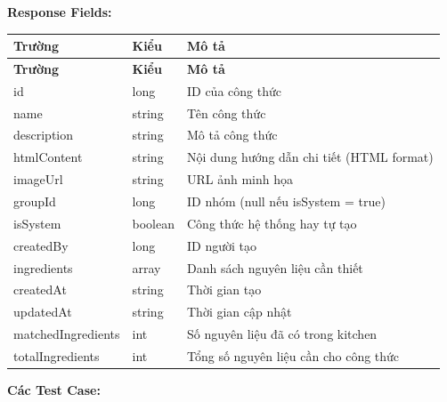 \textbf{Response Fields:}

\begin{longtable}{|p{}|p{}|p{}|}
\hline
\textbf{Trường} & \textbf{Kiểu} & \textbf{Mô tả} \\
\hline
\endfirsthead

\hline
\textbf{Trường} & \textbf{Kiểu} & \textbf{Mô tả} \\
\hline
\endhead

\hline
\endfoot

id & long & ID của công thức \\
\hline
name & string & Tên công thức \\
\hline
description & string & Mô tả công thức \\
\hline
htmlContent & string & Nội dung hướng dẫn chi tiết (HTML format) \\
\hline
imageUrl & string & URL ảnh minh họa \\
\hline
groupId & long & ID nhóm (null nếu isSystem = true) \\
\hline
isSystem & boolean & Công thức hệ thống hay tự tạo \\
\hline
createdBy & long & ID người tạo \\
\hline
ingredients & array & Danh sách nguyên liệu cần thiết \\
\hline
createdAt & string & Thời gian tạo \\
\hline
updatedAt & string & Thời gian cập nhật \\
\hline
matchedIngredients & int & Số nguyên liệu đã có trong kitchen \\
\hline
totalIngredients & int & Tổng số nguyên liệu cần cho công thức \\
\hline
\end{longtable}

\textbf{Các Test Case:}

